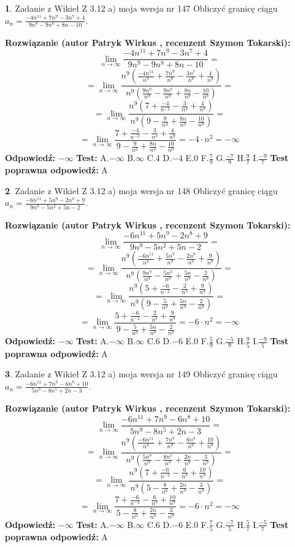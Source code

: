 \documentclass[12pt, a4paper]{article}
\theoremstyle{definition} %
\newtheorem{zad}{}
\newcommand{\zadStart}[1]{\begin{zad}#1\newline}
\newcommand{\zadStop}{\end{zad}}
\newcommand{\rozwStart}[2]{\noindent \textbf{Rozwiązanie (autor #1 , recenzent #2): }\newline}
\newcommand{\rozwStop}{\newline}
\newcommand{\odpStart}{\noindent \textbf{Odpowiedź:}\newline}
\newcommand{\odpStop}{\newline}
\newcommand{\testStart}{\noindent \textbf{Test:}\newline}
\newcommand{\testStop}{\newline}
\newcommand{\kluczStart}{\noindent \textbf{Test poprawna odpowiedź:}\newline}
\newcommand{\kluczStop}{\newline}
\begin{document}
\zadStart{Zadanie z Wikieł Z 3.12 a) moja wersja nr 147}
Obliczyć granicę ciągu $a_{n}=\frac{-4n^{11}+7n^{9}-3n^{7}+4}{9n^{9}-9n^{8}+8n-10}$.
\zadStop
\rozwStart{Patryk Wirkus}{Szymon Tokarski}
$$\lim\limits_{n\to\infty}\frac{-4n^{11}+7n^{9}-3n^{7}+4}{9n^{9}-9n^{8}+8n-10}=$$
$$=\lim\limits_{n\to\infty}\frac{n^{9}\left(\frac{-4n^{11}}{n^{9}}+\frac{7n^{9}}{n^{9}}-\frac{3n^{7}}{n^{9}}+\frac{4}{n^{9}}\right)}{n^{9}\left(\frac{9n^{9}}{n^{9}}-\frac{9n^{8}}{n^{9}}+\frac{8n}{n^{9}}-\frac{10}{n^{9}}\right)}=$$
$$=\lim\limits_{n\to\infty}\frac{n^{9}\left(7+\frac{-4}{n^{-2}}-\frac{3}{n^{4}}+\frac{4}{n^{9}}\right)}
{n^{9}\left(9-\frac{9}{n^{3}}+\frac{8n}{n^{9}}-\frac{10}{n^{9}}\right)}=$$
$$=\lim\limits_{n\to\infty}\frac{7+\frac{-4}{n^{-2}}-\frac{3}{n^{4}}+\frac{4}{n^{9}}}{9-\frac{9}{n^{3}}+\frac{8n}{n^{9}}-\frac{10}{n^{9}}}=-4\cdot n^{2} = -\infty$$
\rozwStop
\odpStart
$-\infty$
\odpStop
\testStart
A.$-\infty$
B.$\infty$
C.$4$
D.$-4$
E.$0$
F.$\frac{7}{9}$
G.$\frac{-7}{9}$
H.$\frac{9}{7}$
I.$\frac{-9}{7}$
\testStop
\kluczStart
A
\kluczStop



\zadStart{Zadanie z Wikieł Z 3.12 a) moja wersja nr 148}
Obliczyć granicę ciągu $a_{n}=\frac{-6n^{11}+5n^{9}-2n^{8}+9}{9n^{9}-5n^{2}+5n-2}$.
\zadStop
\rozwStart{Patryk Wirkus}{Szymon Tokarski}
$$\lim\limits_{n\to\infty}\frac{-6n^{11}+5n^{9}-2n^{8}+9}{9n^{9}-5n^{2}+5n-2}=$$
$$=\lim\limits_{n\to\infty}\frac{n^{9}\left(\frac{-6n^{11}}{n^{9}}+\frac{5n^{9}}{n^{9}}-\frac{2n^{8}}{n^{9}}+\frac{9}{n^{9}}\right)}{n^{9}\left(\frac{9n^{9}}{n^{9}}-\frac{5n^{2}}{n^{9}}+\frac{5n}{n^{9}}-\frac{2}{n^{9}}\right)}=$$
$$=\lim\limits_{n\to\infty}\frac{n^{9}\left(5+\frac{-6}{n^{-2}}-\frac{2}{n^{3}}+\frac{9}{n^{9}}\right)}
{n^{9}\left(9-\frac{5}{n^{9}}+\frac{5n}{n^{9}}-\frac{2}{n^{9}}\right)}=$$
$$=\lim\limits_{n\to\infty}\frac{5+\frac{-6}{n^{-2}}-\frac{2}{n^{3}}+\frac{9}{n^{9}}}{9-\frac{5}{n^{9}}+\frac{5n}{n^{9}}-\frac{2}{n^{9}}}=-6\cdot n^{2} = -\infty$$
\rozwStop
\odpStart
$-\infty$
\odpStop
\testStart
A.$-\infty$
B.$\infty$
C.$6$
D.$-6$
E.$0$
F.$\frac{5}{9}$
G.$\frac{-5}{9}$
H.$\frac{9}{5}$
I.$\frac{-9}{5}$
\testStop
\kluczStart
A
\kluczStop



\zadStart{Zadanie z Wikieł Z 3.12 a) moja wersja nr 149}
Obliczyć granicę ciągu $a_{n}=\frac{-6n^{11}+7n^{9}-6n^{8}+10}{5n^{9}-8n^{5}+2n-3}$.
\zadStop
\rozwStart{Patryk Wirkus}{Szymon Tokarski}
$$\lim\limits_{n\to\infty}\frac{-6n^{11}+7n^{9}-6n^{8}+10}{5n^{9}-8n^{5}+2n-3}=$$
$$=\lim\limits_{n\to\infty}\frac{n^{9}\left(\frac{-6n^{11}}{n^{9}}+\frac{7n^{9}}{n^{9}}-\frac{6n^{8}}{n^{9}}+\frac{10}{n^{9}}\right)}{n^{9}\left(\frac{5n^{9}}{n^{9}}-\frac{8n^{5}}{n^{9}}+\frac{2n}{n^{9}}-\frac{3}{n^{9}}\right)}=$$
$$=\lim\limits_{n\to\infty}\frac{n^{9}\left(7+\frac{-6}{n^{-2}}-\frac{6}{n^{3}}+\frac{10}{n^{9}}\right)}
{n^{9}\left(5-\frac{8}{n^{6}}+\frac{2n}{n^{9}}-\frac{3}{n^{9}}\right)}=$$
$$=\lim\limits_{n\to\infty}\frac{7+\frac{-6}{n^{-2}}-\frac{6}{n^{3}}+\frac{10}{n^{9}}}{5-\frac{8}{n^{6}}+\frac{2n}{n^{9}}-\frac{3}{n^{9}}}=-6\cdot n^{2} = -\infty$$
\rozwStop
\odpStart
$-\infty$
\odpStop
\testStart
A.$-\infty$
B.$\infty$
C.$6$
D.$-6$
E.$0$
F.$\frac{7}{5}$
G.$\frac{-7}{5}$
H.$\frac{5}{7}$
I.$\frac{-5}{7}$
\testStop
\kluczStart
A
\kluczStop
\end{document}
